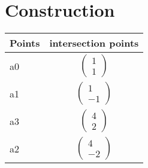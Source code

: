 \documentclass[journal,10pt,twocolumn]{article}
\newcommand{\myvec}[1]{\ensuremath{\begin{pmatrix}#1\end{pmatrix}}}
\begin{document}
\section*{\large Construction}

{
\setlength\extrarowheight{5pt}
\begin{tabular}{|l|c|}
    \hline 
    \textbf{Points} & \textbf{intersection points} \\ \hline
	a0 & $\myvec{
   1\\
   1
   } $ \\\hline
	a1 & $\myvec{
   1\\
   -1
   } $ \\\hline
    
	a3 & $\myvec{
   4\\
   2
   } $ \\\hline
	a2 & $\myvec{
   4\\
   -2
   } $ \\\hline
      
      \end{tabular}
}
\end{document}
